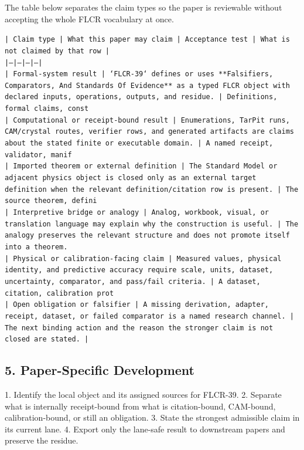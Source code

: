 \documentclass[11pt]{article}
\begin{document}
The table below separates the claim types so the paper is reviewable without accepting the whole FLCR vocabulary at once.

\noindent\texttt{| Claim type | What this paper may claim | Acceptance test | What is not claimed by that row |}\\
\noindent\texttt{|---|---|---|---|}\\
\noindent\texttt{| Formal-system result | `FLCR-39` defines or uses **Falsifiers, Comparators, And Standards Of Evidence** as a typed FLCR object with declared inputs, operations, outputs, and residue. | Definitions, formal claims, const}\\
\noindent\texttt{| Computational or receipt-bound result | Enumerations, TarPit runs, CAM/crystal routes, verifier rows, and generated artifacts are claims about the stated finite or executable domain. | A named receipt, validator, manif}\\
\noindent\texttt{| Imported theorem or external definition | The Standard Model or adjacent physics object is closed only as an external target definition when the relevant definition/citation row is present. | The source theorem, defini}\\
\noindent\texttt{| Interpretive bridge or analogy | Analog, workbook, visual, or translation language may explain why the construction is useful. | The analogy preserves the relevant structure and does not promote itself into a theorem. }\\
\noindent\texttt{| Physical or calibration-facing claim | Measured values, physical identity, and predictive accuracy require scale, units, dataset, uncertainty, comparator, and pass/fail criteria. | A dataset, citation, calibration prot}\\
\noindent\texttt{| Open obligation or falsifier | A missing derivation, adapter, receipt, dataset, or failed comparator is a named research channel. | The next binding action and the reason the stronger claim is not closed are stated. | }\\

\subsection*{5. Paper-Specific Development}

1. Identify the local object and its assigned sources for FLCR-39.
2. Separate what is internally receipt-bound from what is citation-bound, CAM-bound, calibration-bound, or still an obligation.
3. State the strongest admissible claim in its current lane.
4. Export only the lane-safe result to downstream papers and preserve the residue.
\end{document}
